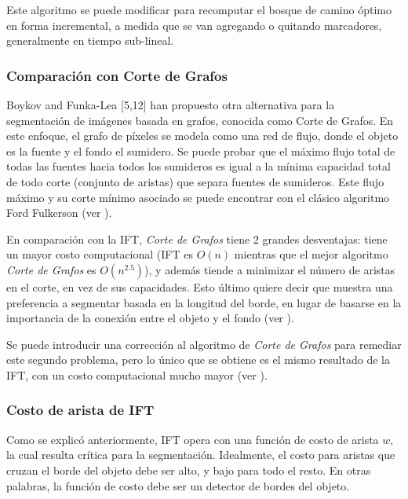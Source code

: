 Este algoritmo se puede modificar para recomputar el bosque de camino óptimo
en forma incremental, a medida que se van agregando o quitando marcadores,
generalmente en tiempo sub-lineal.

\subsubsection{Comparación con Corte de Grafos}

Boykov and Funka-Lea [5,12] han propuesto otra alternativa para la segmentación
de imágenes basada en grafos, conocida como Corte de Grafos.
En este enfoque, el grafo de píxeles se modela como una red de flujo,
donde el objeto es la fuente y el fondo el sumidero. Se puede probar que el máximo flujo total de todas las fuentes
hacia todos los sumideros es igual a la mínima capacidad total de todo corte
(conjunto de aristas) que separa fuentes de sumideros. Este flujo máximo y su
corte mínimo asociado se puede encontrar con el clásico algoritmo
Ford Fulkerson (ver \cite{Cormen:2009:IAT:1614191}).

En comparación con la IFT, \textit{Corte de Grafos} tiene 2 grandes desventajas:
tiene un mayor costo computacional (IFT es $O(n)$ mientras que
el mejor algoritmo \textit{Corte de Grafos} es $O(n^{2.5})$), y además tiende a
minimizar el número de aristas en el corte, en vez de sus capacidades. Esto
último quiere decir que muestra una preferencia a segmentar basada en la
longitud del borde, en lugar de basarse en la importancia de la conexión
entre el objeto y el fondo (ver \cite{journals/jmiv/MirandaF09}).

Se puede introducir una corrección al algoritmo de \textit{Corte de Grafos} para
remediar este segundo problema, pero lo único que se obtiene es el mismo
resultado de la IFT, con un costo computacional mucho mayor (ver \cite{journals/jmiv/MirandaF09}).

\subsubsection{Costo de arista de IFT}

Como se explicó anteriormente, IFT opera con una función de costo de arista
$w$, la cual resulta crítica para la segmentación. Idealmente, el costo
para aristas que cruzan el borde del objeto debe ser alto, y bajo para todo
el resto. En otras palabras, la función de costo debe ser un detector
de bordes del objeto.

